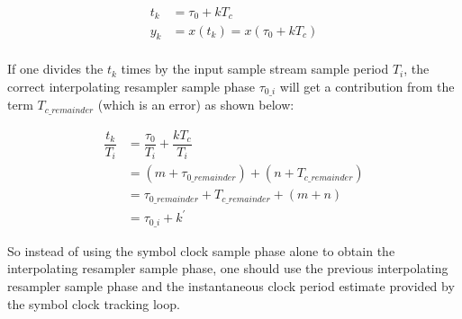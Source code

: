 \documentclass{article}
\begin{document}
\begin{align*}
   t_{k} &= \tau_{0} + k T_{c} \\
   y_{k} &= x(t_{k}) = x(\tau_{0} + k T_{c}) \\
\end{align*}

If one divides the $t_{k}$ times by the input sample stream sample period
$T_{i}$, the correct interpolating resampler sample phase $\tau_{0\_i}$ will
get a contribution from the term $T_{c\_remainder}$ (which is an error) as shown
below:

\begin{align*}
   \dfrac{t_{k}}{T_{i}} &= \dfrac{\tau_{0}}{T_{i}} + \dfrac{k T_{c}}{T_{i}} \\
    &= (m + \tau_{0\_remainder}) + (n + T_{c\_remainder}) \\
    &= \tau_{0\_remainder} + T_{c\_remainder} + (m + n) \\
    &= \tau_{0\_i} + k^{\prime}
\end{align*}

So instead of using the symbol clock sample phase alone to obtain the
interpolating resampler sample phase, one should use the previous interpolating
resampler sample phase and the instantaneous clock period estimate provided by
the symbol clock tracking loop.
\end{document}
